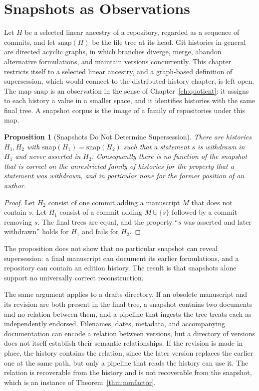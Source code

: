 \documentclass[12pt,oneside,openany]{book}
\theoremstyle{spherepop}
\newtheorem{proposition}[definition]{Proposition}
\theoremstyle{remarkstyle}
\begin{document}
\section{Snapshots as Observations}

Let $H$ be a selected linear ancestry of a repository, regarded as a sequence of commits, and let $\mathrm{snap}(H)$ be the file tree at its head. Git histories in general are directed acyclic graphs, in which branches diverge, merge, abandon alternative formulations, and maintain versions concurrently. This chapter restricts itself to a selected linear ancestry, and a graph-based definition of supersession, which would connect to the distributed-history chapter, is left open. The map $\mathrm{snap}$ is an observation in the sense of Chapter~\ref{ch:quotient}: it assigns to each history a value in a smaller space, and it identifies histories with the same final tree. A snapshot corpus is the image of a family of repositories under this map.

\begin{proposition}[Snapshots Do Not Determine Supersession]
\label{prop:snapshot}
There are histories $H_1,H_2$ with $\mathrm{snap}(H_1)=\mathrm{snap}(H_2)$ such that a statement $s$ is withdrawn in $H_1$ and never asserted in $H_2$. Consequently there is no function of the snapshot that is correct on the unrestricted family of histories for the property that a statement was withdrawn, and in particular none for the former position of an author.
\end{proposition}

\begin{proof}
Let $H_2$ consist of one commit adding a manuscript $M$ that does not contain $s$. Let $H_1$ consist of a commit adding $M\cup\{s\}$ followed by a commit removing $s$. The final trees are equal, and the property ``$s$ was asserted and later withdrawn'' holds for $H_1$ and fails for $H_2$.
\end{proof}

The proposition does not show that no particular snapshot can reveal supersession: a final manuscript can document its earlier formulations, and a repository can contain an edition history. The result is that snapshots alone support no universally correct reconstruction.

The same argument applies to a drafts directory. If an obsolete manuscript and its revision are both present in the final tree, a snapshot contains two documents and no relation between them, and a pipeline that ingests the tree treats each as independently endorsed. Filenames, dates, metadata, and accompanying documentation can encode a relation between versions, but a directory of versions does not itself establish their semantic relationships. If the revision is made in place, the history contains the relation, since the later version replaces the earlier one at the same path, but only a pipeline that reads the history can use it. The relation is recoverable from the history and is not recoverable from the snapshot, which is an instance of Theorem~\ref{thm:nonfactor}.
\end{document}
